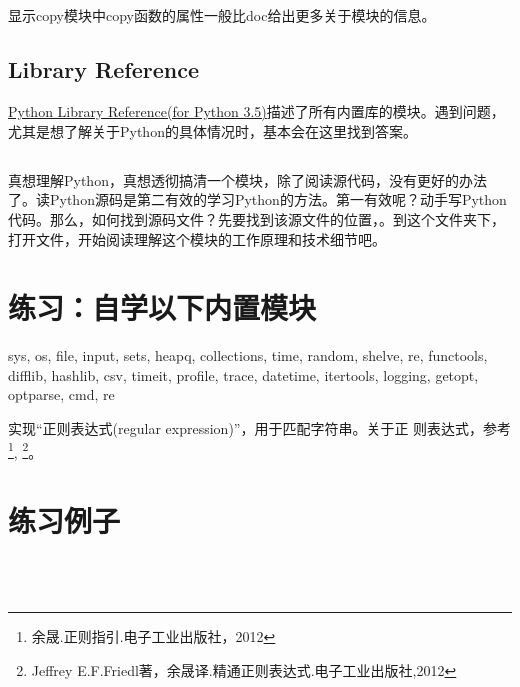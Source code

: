 \subsection{}
显示copy模块中copy函数的属性一般比doc给出更多关于模块的信息。
\subsection{Library Reference}
\href{https://docs.python.org/3.5/library/index.html}{Python Library Reference(for Python 3.5)}描述了所有内置库的模块。遇到问题，尤其是想了解关于Python的具体情况时，基本会在这里找到答案。
\subsection{}
真想理解Python，真想透彻搞清一个模块，除了阅读源代码，没有更好的办法了。读Python源码是第二有效的学习Python的方法。第一有效呢？动手写Python代码。那么，如何找到源码文件？先要找到该源文件的位置，。到这个文件夹下，打开文件，开始阅读理解这个模块的工作原理和技术细节吧。

\section{练习：自学以下内置模块}
\begin{python}
  sys, os, file, input, sets, heapq, collections, time, random,
  shelve, re, functools, difflib, hashlib, csv, timeit, profile,
  trace, datetime, itertools, logging, getopt, optparse, cmd, re
\end{python}

实现“正则表达式(regular expression)”，用于匹配字符串。关于正
则表达式，参考\footnote{余晟.正则指引.电子工业出版社，2012},
\footnote{Jeffrey E.F.Friedl著，余晟译.精通正则表达式.电子工业出版社,2012}。


\section{练习例子}
 \\
 \\

